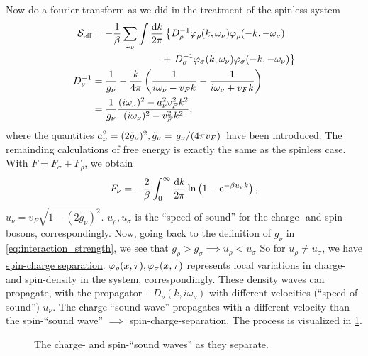 Now do a fourier transform as we did in the treatment of the spinless system
\begin{align*}
\mathcal{S}_{\text{eff}} &= -\frac1\beta\sum_{\omega_\nu}\int\frac{\dd k}{2\pi}\left\{D_\rho^{-1}\varphi_\rho(k,\omega_\nu)\varphi_\rho(-k,-\omega_\nu)\right. \\
&\hspace{7em}+ \left.D_\sigma^{-1}\varphi_\sigma(k,\omega_\nu)\varphi_\sigma(-k,-\omega_\nu)\right\} \\
D_\nu^{-1} &= \frac{1}{g_\nu}-\frac{k}{4\pi}\left(\frac{1}{i\omega_\nu-v_Fk} - \frac{1}{i\omega_\nu +v_Fk}\right) \\
&=\frac{1}{g_\nu}\frac{(i\omega_\nu)^2-a_\nu^2v_F^2k^2}{(i\omega_\nu)^2-v_F^2k^2},
\end{align*}
where the quantities \(a_\nu^2 = (2\tilde{g}_\nu)^2, \tilde{g}_\nu =\flatfrac{g_\nu}{(4\pi v_F)}\) have been introduced. The remainding calculations of free energy is exactly the same as the spinless case. With \(F = F_\sigma+F_\rho\), we obtain
\begin{equation}
F_\nu = -\frac{2}{\beta}\int_0^\infty\frac{\dd k}{2\pi}\ln\left(1-\mathrm{e}^{-\beta u_\nu k}\right),
\end{equation}
\(u_\nu = v_F\sqrt{1-(2\tilde{g}_\nu)^2}\). \(u_\rho, u_\sigma\) is the ``speed of sound'' for the charge- and spin-bosons, correspondingly. Now, going back to the definition of \(g_\nu\) in \cref{eq:interaction_strength}, we see that \(g_\rho >g_\sigma \implies u_\rho < u_\sigma\)
So for \(u_\rho\ne u_\sigma\), we have \underline{spin-charge separation}. \(\varphi_\rho(x, \tau), \varphi_\sigma(x, \tau)\) represents local variations in charge- and spin-density in the system, correspondingly. These density waves can propagate, with the propagator $-D_\nu(k, i\omega_\nu)$ with different velocities (``speed of sound'') \(u_\nu\).  The charge-``sound wave'' propagates with a different velocity than the spin-``sound wave'' $\implies$ spin-charge-separation. The process is visualized in \cref{fig:charge_spin_wave}.
\begin{figure}
	\centering
	\begin{subfigure}{0.45\textwidth}
		
	\end{subfigure}
	\begin{subfigure}{0.45\textwidth}
		
	\end{subfigure}	
	\caption{The charge- and spin-``sound waves'' as they separate.}
	\label{fig:charge_spin_wave}
\end{figure}

